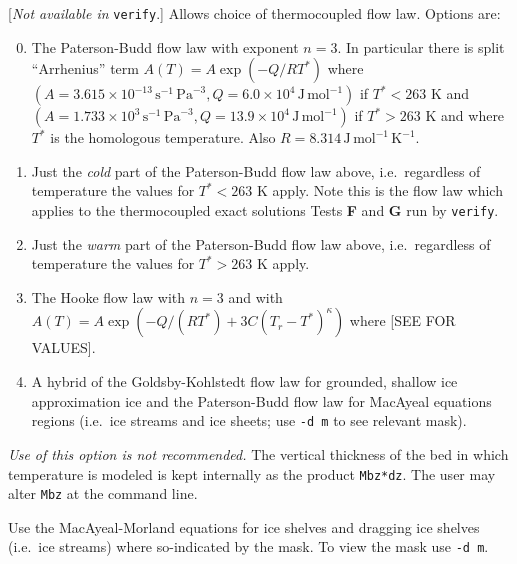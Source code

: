 \documentclass[11pt,final]{amsart}
\begin{document}
  [\emph{Not available in } \verb|verify|.]  Allows choice of thermocoupled flow law.  Options are:\renewcommand{\labelenumi}{\arabic{enumi}:~}\begin{enumerate}\setcounter{enumi}{-1}
\item The Paterson-Budd \cite{PatersonBudd} flow law with exponent $n=3$.  In particular there is split ``Arrhenius'' term $A(T) = A \exp(-Q/RT^*)$ where $(A = 3.615 \times 10^{-13}\, \text{s}^{-1}\, \text{Pa}^{-3}, Q = 6.0 \times 10^4\, \text{J}\, \text{mol}^{-1})$ if $T^* < 263$ K and $(A = 1.733 \times 10^{3}\, \text{s}^{-1}\, \text{Pa}^{-3}, Q = 13.9 \times 10^4\, \text{J}\, \text{mol}^{-1})$ if $T^* > 263$ K and where $T^*$ is the homologous temperature.  Also $R=8.314\, \text{J}\, \text{mol}^{-1}\, \text{K}^{-1}$.
\item Just the \emph{cold} part of the Paterson-Budd flow law above, i.e.~regardless of temperature the values for $T^*<263$ K apply.  Note this is the flow law which applies to the thermocoupled exact solutions Tests \textbf{F} and \textbf{G} run by \verb|verify|.
\item Just the \emph{warm} part of the Paterson-Budd flow law above, i.e.~regardless of temperature the values for $T^*>263$ K apply.
\item The Hooke flow law with $n=3$ and with $A(T) = A \exp(-Q/(RT^*) + 3C (T_r - T^*)^\kappa)$ where [SEE \cite{Hooke,PayneBaldwin} FOR VALUES].
\item A hybrid of the Goldsby-Kohlstedt flow law \cite{GoldsbyKohlstedt} for grounded, shallow ice approximation ice and the Paterson-Budd flow law for MacAyeal equations regions (i.e.~ice streams and ice sheets; use \verb|-d m| to see relevant mask).
\end{enumerate}

  \emph{Use of this option is not recommended.}  The vertical thickness of the bed in which temperature is modeled is kept internally as the product \verb|Mbz*dz|.  The user may alter \verb|Mbz| at the command line.






  Use the MacAyeal-Morland equations for ice shelves and dragging ice shelves (i.e.~ice streams) where so-indicated by the mask.  To view the mask use \verb|-d m|.
\end{document}
